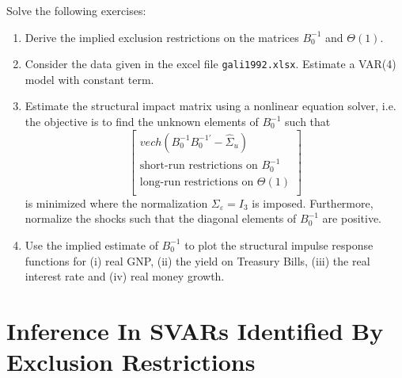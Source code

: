 \documentclass{article}
\begin{document}
Solve the following exercises:
\begin{enumerate}
	\item Derive the implied exclusion restrictions on the matrices $B_0^{-1}$ and $\Theta(1)$.
	\item Consider the data given in the excel file \texttt{gali1992.xlsx}. Estimate a VAR(4) model with constant term.
	\item Estimate the structural impact matrix using a nonlinear equation solver, i.e. the objective is to find the unknown elements of $B_0^{-1}$ such that
	$$\begin{bmatrix}
	vech(B_0^{-1}B_0^{-1'}-\hat{\Sigma}_u)\\
	\text{short-run restrictions on }B_0^{-1}\\
	\text{long-run restrictions on }\Theta(1)\\
	\end{bmatrix}$$
	is minimized where the normalization $\Sigma_\varepsilon=I_3$ is imposed. Furthermore, normalize the shocks such that the diagonal elements of $B_0^{-1}$ are positive.
	\item Use the implied estimate of $B_0^{-1}$ to plot the structural impulse response functions for (i) real GNP, (ii) the yield on Treasury Bills, (iii) the real interest rate and (iv) real money growth.
\end{enumerate}

\newpage

\section{Inference In SVARs Identified By Exclusion Restrictions}
\end{document}
